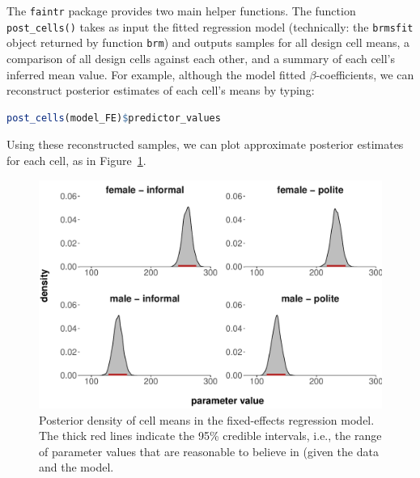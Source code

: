 \documentclass[nobib]{tufte-handout}
\begin{document}
\vspace{-0.5cm}

The \texttt{faintr} package provides two main helper functions.
%
%
The function \texttt{post\_cells()}
takes as input the fitted regression model (technically: the \texttt{brmsfit} object returned
by function \texttt{brm}) and outputs samples for all design cell means, a comparison of all
design cells against each other, and a summary of each cell's inferred mean value.
For example, although the model fitted $\beta$-coefficients, we can reconstruct posterior estimates of each cell's means by typing:

\begin{minipage}[]{1.3\textwidth}
\begin{lstlisting}[language=R]
post_cells(model_FE)$predictor_values
\end{lstlisting}
\end{minipage}

\vspace*{-0.5cm}

\noindent Using these reconstructed samples, we can plot approximate posterior estimates for each cell, as in Figure~\ref{fig:Posteriors_cell_means}.

\begin{figure}
  \centering
  \includegraphics[width=\textwidth]{pics/posterior_density_cell_means.pdf}
  \caption[Posteriors over cell means in fixed-effects model]{Posterior density of cell means
    in the fixed-effects regression model. The thick red lines indicate the 95\% credible
    intervals, i.e., the range of parameter values that are reasonable to believe in (given the data and the model.}
  \label{fig:Posteriors_cell_means}
\end{figure}
\end{document}
